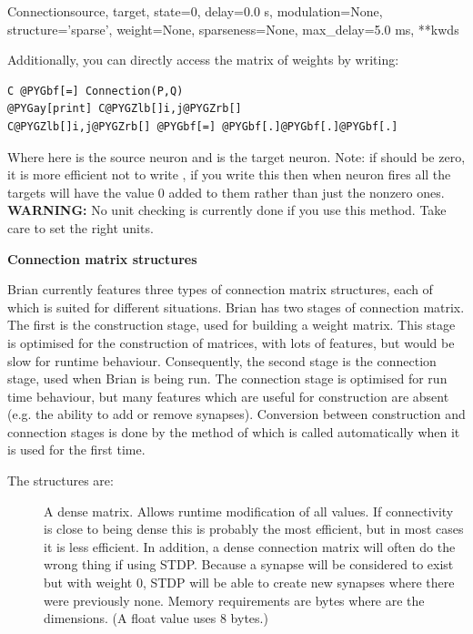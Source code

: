 \documentclass[letterpaper,10pt,english]{manual}
\begin{document}
\begin{classdesc}{Connection}{source, target, state=0, delay=0.0 s, modulation=None, structure='sparse', weight=None, sparseness=None, max\_delay=5.0 ms, **kwds}
\begin{description}
\end{description}

Additionally, you can directly access the matrix of weights by writing:

\begin{Verbatim}[commandchars=@\[\]]
C @PYGbf[=] Connection(P,Q)
@PYGay[print] C@PYGZlb[]i,j@PYGZrb[]
C@PYGZlb[]i,j@PYGZrb[] @PYGbf[=] @PYGbf[.]@PYGbf[.]@PYGbf[.]
\end{Verbatim}

Where here  is the source neuron and  is the target neuron.
Note: if  should be zero, it is more efficient not to write
, if you write this then when neuron  fires all the
targets will have the value 0 added to them rather than just the
nonzero ones.
\textbf{WARNING:} No unit checking is currently done if you use this method.
Take care to set the right units.

\textbf{Connection matrix structures}

Brian currently features three types of connection matrix structures,
each of which is suited for different situations. Brian has two stages
of connection matrix. The first is the construction stage, used for
building a weight matrix. This stage is optimised for the construction
of matrices, with lots of features, but would be slow for runtime
behaviour. Consequently, the second stage is the connection stage,
used when Brian is being run. The connection stage is optimised for
run time behaviour, but many features which are useful for construction
are absent (e.g. the ability to add or remove synapses). Conversion
between construction and connection stages is done by the
 method of \hyperlink{brian.Connection}{} which is called
automatically when it is used for the first time.

The structures are:
\begin{description}
\item[]
A dense matrix. Allows runtime modification of all values. If
connectivity is close to being dense this is probably the most
efficient, but in most cases it is less efficient. In addition,
a dense connection matrix will often do the wrong thing if
using STDP. Because a synapse will be considered to exist but
with weight 0, STDP will be able to create new synapses where
there were previously none. Memory requirements are 
bytes where  are the dimensions. (A  float
value uses 8 bytes.)


\end{description}
\end{classdesc}
\end{document}
